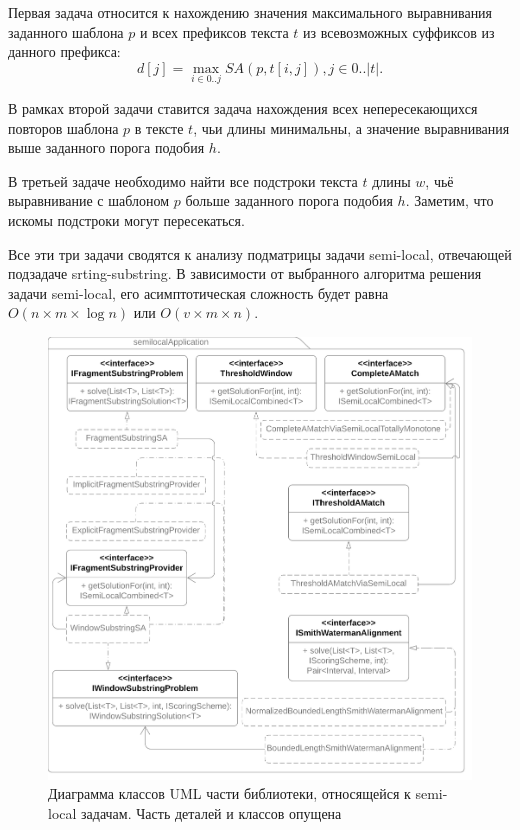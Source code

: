 Первая задача относится к нахождению значения максимального выравнивания заданного шаблона $p$ и всех префиксов текста $t$ из всевозможных суффиксов из данного префикса:
\begin{equation}
    d[j] = \max _{i \in 0 ..j} SA(p,t[i,j]), j \in 0..|t|.
\end{equation}

В рамках второй задачи ставится задача нахождения всех непересекающихся повторов шаблона $p$ в тексте $t$, чьи длины минимальны, а значение выравнивания выше заданного порога подобия $h$.

В третьей задаче необходимо найти все подстроки текста $t$ длины $w$, чьё выравнивание с шаблоном $p$ больше заданного порога подобия $h$. Заметим, что искомы подстроки могут пересекаться.

Все эти три задачи сводятся к анализу подматрицы задачи semi-local, отвечающей подзадаче srting-substring.
В зависимости от выбранного алгоритма решения задачи semi-local, его асимптотическая сложность будет равна $O(n \times m \times \log n)$ или $O(v \times  m \times n)$.

\begin{figure}
    \centering
    \includegraphics[width=1.35\columnwidth,angle=90]{Mishin/figures/semiLocalApplication.png}
    \caption{Диаграмма классов UML части библиотеки, относящейся к semi-local задачам. Часть деталей и классов опущена}\label{fig:libraryApplication}
\end{figure}

